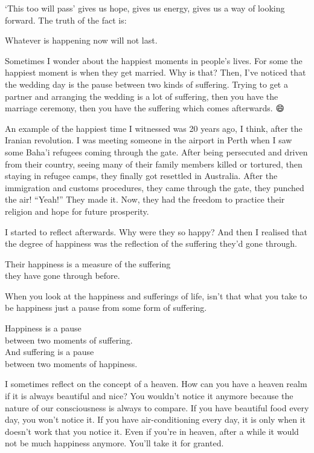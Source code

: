 \documentclass[12pt, openany]{book}
\newenvironment{aphorism}%
{%
\begin{center}\begin{itshape}
}%
{\end{itshape}\end{center}
}%
\begin{document}
‘This too will pass’ gives us hope, gives us energy, gives us a way of looking forward. The truth of the fact is: 

\begin{aphorism}
Whatever is happening now will not last.
\end{aphorism}

Sometimes I wonder about the happiest moments in people’s lives. For some the happiest moment is when they get married. Why is that? Then, I’ve noticed that the wedding day is the pause between two kinds of suffering. Trying to get a partner and arranging the wedding is a lot of suffering, then you have the marriage ceremony, then you have the suffering which comes afterwards. 😄

An example of the happiest time I witnessed was 20 years ago, I think, after the Iranian revolution. I was meeting someone in the airport in Perth when I saw some Baha’i refugees coming through the gate. After being persecuted and driven from their country, seeing many of their family members killed or tortured, then staying in refugee camps, they finally got resettled in Australia. After the immigration and customs procedures, they came through the gate, they punched the air! “Yeah!” They made it. Now, they had the freedom to practice their religion and hope for future prosperity. 

I started to reflect afterwards. Why were they so happy? And then I realised that the degree of happiness was the reflection of the suffering they’d gone through. 

\begin{aphorism}
Their happiness is a measure of the suffering\\  
they have gone through before.
\end{aphorism}

When you look at the happiness and sufferings of life, isn’t that what you take to be happiness just a pause from some form of suffering. 

\begin{aphorism}
Happiness is a pause\\  
between two moments of suffering.\\ 
And suffering is a pause\\  
between two moments of happiness.
\end{aphorism}

I sometimes reflect on the concept of a heaven. How can you have a heaven realm if it is always beautiful and nice? You wouldn’t notice it anymore because the nature of our consciousness is always to compare. If you have beautiful food every day, you won’t notice it. If you have air-conditioning every day, it is only when it doesn’t work that you notice it. Even if you’re in heaven, after a while it would not be much happiness anymore. You’ll take it for granted. 
\end{document}
